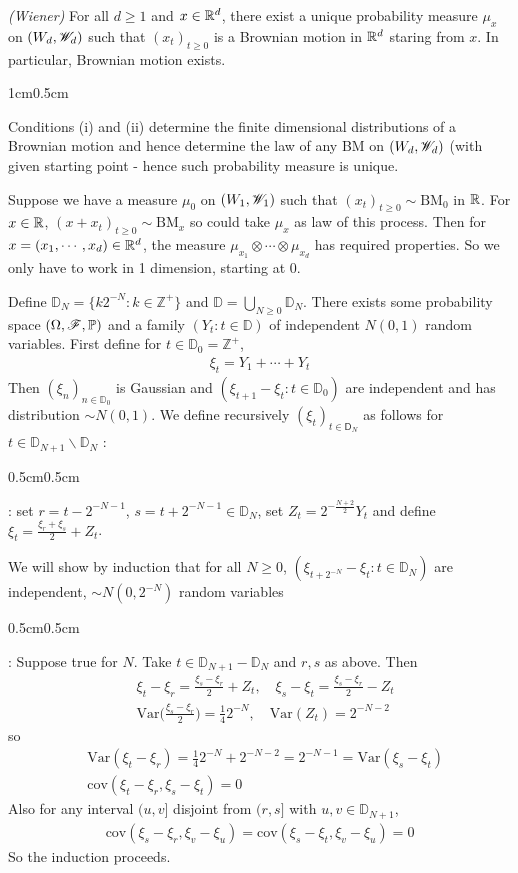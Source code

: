 \documentclass[12pt,a4paper]{report}
\newenvironment{proof}
{\begin{changemargin}{1cm}{0.5cm} 
	}%
	{\end{changemargin}
}
\newenvironment{subproof}
{\begin{changemargin}{0.5cm}{0.5cm} 
	}%
	{\end{changemargin}
}
\begin{document}
\emph{(Wiener)} For all $d\geq 1$ and $x\in \mathbb{R}^d$, there exist a unique probability measure $\mu_x$ on $(W_d, \mathscr{W}_d)$ such that $(x_t)_{t\geq 0}$ is a Brownian motion in $\mathbb{R}^d$ staring from $x$. In particular, Brownian motion exists.
\begin{proof}
\pf Conditions (i) and (ii) determine the finite dimensional distributions of a Brownian motion and hence determine the law of any BM on $(W_d, \mathscr{W}_d)$ (with given starting point - hence such probability measure is unique.

\quad Suppose we have a measure $\mu_0$ on $(W_1, \mathscr{W}_1)$ such that $(x_t)_{t\geq 0} \sim \text{BM}_0$ in $\mathbb{R}$. For $x\in \mathbb{R}$, $(x+x_t)_{t\geq 0} \sim \text{BM}_x$ so could take $\mu_x$ as law of this process. Then for $x=(x_1, \cdots, x_d) \in \mathbb{R}^d$, the measure $\mu_{x_1} \otimes \cdots \otimes \mu_{x_d}$ has required properties. So we only have to work in 1 dimension, starting at 0.

\quad Define $\mathbb{D}_N = \{k2^{-N}: k\in \mathbb{Z}^+ \}$ and $\mathbb{D} = \bigcup_{N\geq 0} \mathbb{D}_N$. There exists some probability space $(\Omega, \mathscr{F}, \mathbb{P})$ and a family $(Y_t : t\in \mathbb{D})$ of independent $N(0,1)$ random variables. First define for $t\in \mathbb{D}_0 = \mathbb{Z}^+$,
\begin{align*}
\xi_t = Y_1 + \cdots + Y_t
\end{align*}
Then $(\xi_n)_{n \in \mathbb{D}_0}$ is Gaussian and $(\xi_{t+1} - \xi_t : t\in \mathbb{D}_0)$ are independent and has distribution $\sim N(0,1)$. We define recursively $(\xi_t)_{t\in \mathsf{D}_N}$ as follows for $t\in \mathbb{D}_{N+1} \backslash \mathbb{D}_N$ :
\begin{subproof}
: set $r = t-2^{-N-1}$, $s=t+2^{-N-1} \in \mathbb{D}_N$, set $Z_t = 2^{- \frac{N+2}{2}} Y_t$ and define $\xi_t = \frac{\xi_r + \xi_s}{2} + Z_t$.
\end{subproof}
We will show by induction that for all $N\geq 0$, $(\xi_{t+2^{-N}} - \xi_t: t\in \mathbb{D}_N)$ are independent, $\sim N(0,2^{-N})$ random variables
\begin{subproof}
: Suppose true for $N$. Take $t\in \mathbb{D}_{N+1} - \mathbb{D}_N$ and $r,s$ as above. Then
\begin{align*}
& \xi_t - \xi_r = \frac{\xi_s - \xi_r}{2} + Z_t, \quad \xi_s - \xi_t = \frac{\xi_s - \xi_r}{2} - Z_t \\
& \text{Var}\Big( \frac{\xi_s-\xi_r}{2}\Big) = \frac{1}{4} 2^{-N}, \quad \text{Var}(Z_t) = 2^{-N-2}
\end{align*}
so
\begin{align*}
& \text{Var}(\xi_t - \xi_r) = \frac{1}{4} 2^{-N} + 2^{-N-2} = 2^{-N-1} = \text{Var} (\xi_s -\xi_t) \\
& \text{cov}(\xi_t -\xi_r, \xi_s - \xi_t) =0
\end{align*}
Also for any interval $(u,v]$ disjoint from $(r,s]$ with $u,v\in \mathbb{D}_{N+1}$,
\begin{align*}
\text{cov}(\xi_s - \xi_r, \xi_v - \xi_u) = \text{cov}(\xi_s - \xi_t, \xi_v- \xi_u) =0
\end{align*}
So the induction proceeds.
\end{subproof}
\end{proof}
\s
\end{document}

